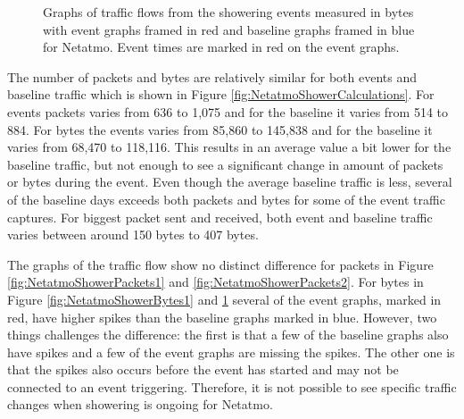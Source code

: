 \begin{figure}[H]
\begin{subfigure}[b]{0.47\textwidth}
    \end{subfigure}
        \begin{subfigure}[b]{0.47\textwidth}
        \centering
    \end{subfigure}
    \begin{subfigure}[b]{0.47\textwidth}
        \centering
    \end{subfigure}
    \begin{subfigure}[b]{0.47\textwidth}
        \centering
    \end{subfigure}
    \hspace{0.6cm}
    \begin{subfigure}[b]{0.47\textwidth}
    \centering
        \end{subfigure}
    \caption{Graphs of traffic flows from the showering events measured in bytes with event graphs framed in red and baseline graphs framed in blue for Netatmo. Event times are marked in red on the event graphs.}    
    \label{fig:NetatmoShowerBytes2}
\end{figure}

The number of packets and bytes are relatively similar for both events and baseline traffic which is shown in Figure \ref{fig:NetatmoShowerCalculations}. For events packets varies from 636 to 1,075 and for the baseline it varies from 514 to 884. For bytes the events varies from 85,860 to 145,838 and for the baseline it varies from 68,470 to 118,116. This results in an average value a bit lower for the baseline traffic, but not enough to see a significant change in amount of packets or bytes during the event. Even though the average baseline traffic is less, several of the baseline days exceeds both packets and bytes for some of the event traffic captures. For biggest packet sent and received, both event and baseline traffic varies between around 150 bytes to 407 bytes. 

The graphs of the traffic flow show no distinct difference for packets in Figure \ref{fig:NetatmoShowerPackets1} and \ref{fig:NetatmoShowerPackets2}. For bytes in Figure \ref{fig:NetatmoShowerBytes1} and \ref{fig:NetatmoShowerBytes2} several of the event graphs, marked in red, have higher spikes than the baseline graphs marked in blue. However, two things challenges the difference: the first is that a few of the baseline graphs also have spikes and a few of the event graphs are missing the spikes. The other one is that the spikes also occurs before the event has started and may not be connected to an event triggering. Therefore, it is not possible to see specific traffic changes when showering is ongoing for Netatmo. 

